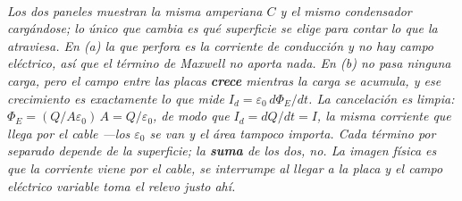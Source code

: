 \begin{center}
\\[0.5em]
{\small\itshape Los dos paneles muestran la \emph{misma} amperiana $C$ y el
mismo condensador cargándose; lo único que cambia es qué superficie se elige
para contar lo que la atraviesa. En (a) la que perfora es la corriente de
conducción y no hay campo eléctrico, así que el término de Maxwell no aporta
nada. En (b) no pasa ninguna carga, pero el campo entre las placas
\textbf{crece} mientras la carga se acumula, y ese crecimiento es exactamente
lo que mide $I_d = \varepsilon_0\,d\Phi_E/dt$. La cancelación es limpia:
$\Phi_E = (Q/A\varepsilon_0)\,A = Q/\varepsilon_0$, de modo que
$I_d = dQ/dt = I$, la misma corriente que llega por el cable ---los
$\varepsilon_0$ se van y el área tampoco importa. Cada término por separado
depende de la superficie; la \textbf{suma} de los dos, no. La imagen física es
que la corriente viene por el cable, se interrumpe al llegar a la placa y el
campo eléctrico variable toma el relevo justo ahí.}
\end{center}
